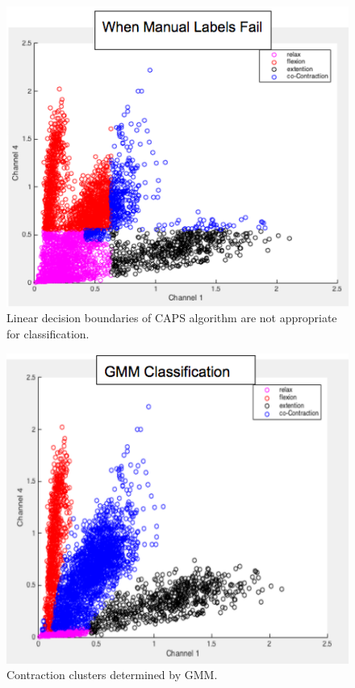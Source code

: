 \documentclass[times, 10pt,twocolumn]{article}
\begin{document}
\begin{figure}
  \includegraphics[width=\linewidth]{Figures/f5.png}
  \caption{Linear decision boundaries of CAPS algorithm are not appropriate for classification.}
  \label{fig:manual_clusters_fail}
\end{figure}

\begin{figure}
  \includegraphics[width=\linewidth]{Figures/f6.png}
  \caption{Contraction clusters determined by GMM.}
  \label{fig:gmm_clusters}
\end{figure}
\end{document}
